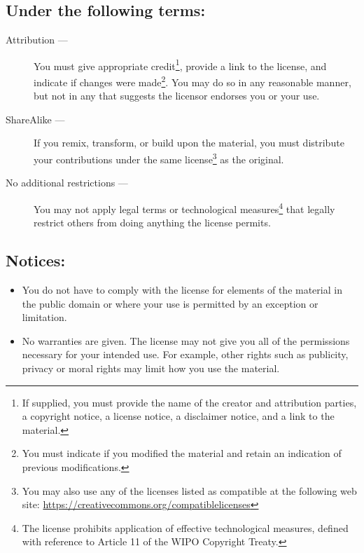 \documentclass[letterpaper,twoside]{article}
\begin{document}
\subsection{Under the following terms:}
\begin{description}
\item[Attribution ---]You must give appropriate credit\footnote{If supplied,
  you must provide the name of the creator and attribution parties,
  a copyright notice, a license notice, a disclaimer notice, and a link
  to the material.}, provide a link to
  the license, and indicate if changes were made\footnote{You must indicate if
    you modified the material and retain an indication of previous
    modifications.}.  You may do so in any
  reasonable manner, but not in any that suggests the licensor endorses you
  or your use.
\item[ShareAlike ---]If you remix, transform, or build upon the material,
  you must distribute your contributions under the same
  license\footnote{You may also use any of the licenses listed as compatible
    at the following web site:
    \href{https://creativecommons.org/compatiblelicenses}{https://creativecommons.org/compatiblelicenses}}
  as the original.
\item[No additional restrictions ---]You may not apply legal terms or
  technological measures\footnote{The license prohibits application of
    effective technological measures, defined with reference to Article 11
    of the WIPO Copyright Treaty.}
  that legally restrict others from doing anything
  the license permits.
\end{description}
\subsection{Notices:}
\begin{itemize}
\item{You do not have to comply with the license for elements of the
  material in the public domain or where your use is permitted by an
  exception or limitation.}
\item{No warranties are given.  The license may not give you all of the
  permissions necessary for your intended use.  For example, other rights
  such as publicity, privacy or moral rights may limit how you use the
  material.}
\end{itemize}


\end{document}
